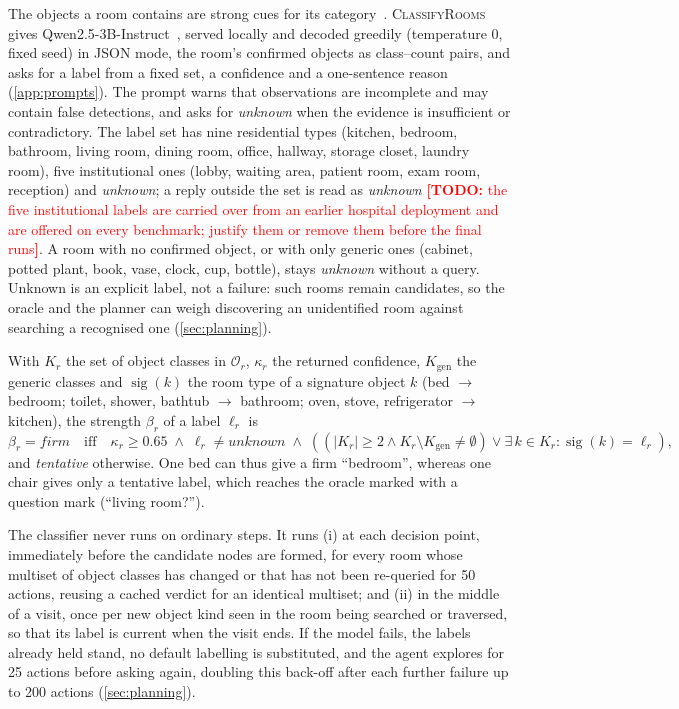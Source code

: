 \documentclass[10pt]{article}
\newcommand{\TODO}[1]{\textcolor{red}{\textbf{[TODO:} #1\textbf{]}}}
\newcommand{\Ob}{\mathcal{O}}
\begin{document}
The objects a room contains are strong cues for its category~\citep{pronobis2012large}. \textsc{ClassifyRooms} gives
Qwen2.5-3B-Instruct~\citep{yang2024qwen25}, served locally and decoded greedily (temperature 0, fixed seed) in JSON
mode, the room's confirmed objects as class--count pairs, and asks for a label from a fixed set, a confidence and a
one-sentence reason (\cref{app:prompts}). The prompt warns that observations are incomplete and may contain false
detections, and asks for \emph{unknown} when the evidence is insufficient or contradictory. The label set has nine
residential types (kitchen, bedroom, bathroom, living room, dining room, office, hallway, storage closet, laundry
room), five institutional ones (lobby, waiting area, patient room, exam room, reception) and \emph{unknown}; a reply
outside the set is read as \emph{unknown} \TODO{the five institutional labels are carried over from an earlier
hospital deployment and are offered on every benchmark; justify them or remove them before the final runs}. A room with no confirmed object, or with only generic ones (cabinet, potted plant, book, vase, clock, cup,
bottle), stays \emph{unknown} without a query. Unknown is an explicit label, not a failure: such rooms remain
candidates, so the oracle and the planner can weigh discovering an unidentified room against searching a recognised
one (\cref{sec:planning}).

With $K_r$ the set of object classes in $\Ob_r$, $\kappa_r$ the returned confidence, $K_{\mathrm{gen}}$ the generic
classes and $\operatorname{sig}(k)$ the room type of a signature object $k$ (bed $\to$ bedroom; toilet, shower, bathtub
$\to$ bathroom; oven, stove, refrigerator $\to$ kitchen), the strength $\beta_r$ of a label $\ell_r$ is
\begin{equation*}
  \beta_r = \textit{firm} \quad\text{iff}\quad
  \kappa_r \geq 0.65 \;\wedge\; \ell_r \neq \textit{unknown} \;\wedge\;
  \left( \left( |K_r| \geq 2 \wedge K_r \setminus K_{\mathrm{gen}} \neq \emptyset \right)
  \vee \exists\, k \in K_r : \operatorname{sig}(k) = \ell_r \right),
\end{equation*}
and \emph{tentative} otherwise. One bed can thus give a firm ``bedroom'', whereas one chair gives only a tentative label,
which reaches the oracle marked with a question mark (``living room?'').

The classifier never runs on ordinary steps. It runs (i) at each decision point, immediately before the candidate
nodes are formed, for every room whose multiset of object classes has changed or that has not been re-queried for 50
actions, reusing a cached verdict for an identical multiset; and (ii) in the middle of a visit, once per new object
kind seen in the room being searched or traversed, so that its label is current when the visit ends. If the model
fails, the labels already held stand, no default labelling is substituted, and the agent explores for 25 actions before
asking again, doubling this back-off after each further failure up to 200 actions (\cref{sec:planning}).
\end{document}
